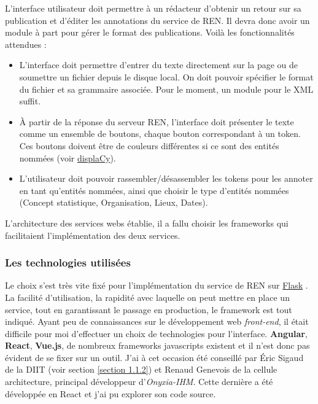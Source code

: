 L'interface utilisateur doit permettre à un rédacteur d'obtenir un retour sur sa publication et d'éditer les annotations du service de REN. Il devra donc avoir un module à part pour gérer le format des publications. Voilà les fonctionnalités attendues :
\begin{itemize}
    \item L'interface doit permettre d'entrer du texte directement sur la page ou de soumettre un fichier depuis le disque local. On doit pouvoir spécifier le format du fichier et sa grammaire associée. Pour le moment, un module pour le XML suffit.
    \item À partir de la réponse du serveur REN, l'interface doit présenter le texte comme un ensemble de boutons, chaque bouton correspondant à un token. Ces boutons doivent être de couleurs différentes si ce sont des entités nommées (voir \href{https://spacy.io/usage/visualizers#ent}{displaCy}\cite{displacy}).
    \item L'utilisateur doit pouvoir rassembler/désassembler les tokens pour les annoter en tant qu'entités nommées, ainsi que choisir le type d'entités nommées (Concept statistique, Organisation, Lieux, Dates).
    \newline
\end{itemize}

L'architecture des services webs établie, il a fallu choisir les frameworks qui facilitaient l'implémentation des deux services.

\label{section 3.2.1 - Architecture des services}

\subsubsection{Les technologies utilisées}
Le choix s'est très vite fixé pour l'implémentation du service de REN sur \href{https://github.com/pallets/flask}{Flask} \cite{flask}. La facilité d'utilisation, la rapidité avec laquelle on peut mettre en place un service, tout en garantissant le passage en production, le framework est tout indiqué. Ayant peu de connaissances sur le développement web \textit{front-end}, il était difficile pour moi d'effectuer un choix de technologies pour l'interface. \textbf{Angular}, \textbf{React}, \textbf{Vue.js}, de nombreux frameworks javascripts existent et il n'est donc pas évident de se fixer sur un outil. J'ai à cet occasion été conseillé par Éric Sigaud de la DIIT (voir section \ref{section 1.1.2}) et Renaud Genevois de la cellule architecture, principal développeur d'\textit{Onyxia-IHM}. Cette dernière a été développée en React et j'ai pu explorer son code source.
\label{section 3.2.2}

